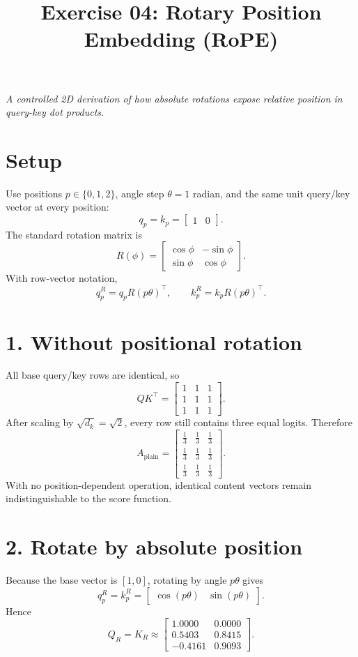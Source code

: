\documentclass[11pt]{article}
\title{\textbf{Exercise 04: Rotary Position Embedding (RoPE)}}
\author{}
\date{}
\begin{document}
\maketitle

\begin{center}
\emph{A controlled 2D derivation of how absolute rotations expose relative position in query-key dot products.}
\end{center}

\section*{Setup}

Use positions $p\in\{0,1,2\}$, angle step $\theta=1$ radian, and the same unit query/key vector at every position:
\[
q_p=k_p=\begin{bmatrix}1&0\end{bmatrix}.
\]
The standard rotation matrix is
\[
R(\phi)=
\begin{bmatrix}
\cos\phi&-\sin\phi\\
\sin\phi&\cos\phi
\end{bmatrix}.
\]
With row-vector notation,
\[
q_p^R=q_pR(p\theta)^\top,
\qquad
k_p^R=k_pR(p\theta)^\top.
\]

\section*{1. Without positional rotation}

All base query/key rows are identical, so
\[
QK^\top=
\begin{bmatrix}
1&1&1\\
1&1&1\\
1&1&1
\end{bmatrix}.
\]
After scaling by $\sqrt{d_k}=\sqrt{2}$, every row still contains three equal logits. Therefore
\[
A_{\mathrm{plain}}=
\begin{bmatrix}
\frac13&\frac13&\frac13\\
\frac13&\frac13&\frac13\\
\frac13&\frac13&\frac13
\end{bmatrix}.
\]
With no position-dependent operation, identical content vectors remain indistinguishable to the score function.

\section*{2. Rotate by absolute position}

Because the base vector is $[1,0]$, rotating by angle $p\theta$ gives
\[
q_p^R=k_p^R=
\begin{bmatrix}
\cos(p\theta)&\sin(p\theta)
\end{bmatrix}.
\]
Hence
\[
Q_R=K_R\approx
\begin{bmatrix}
1.0000&0.0000\\
0.5403&0.8415\\
-0.4161&0.9093
\end{bmatrix}.
\]
\end{document}

